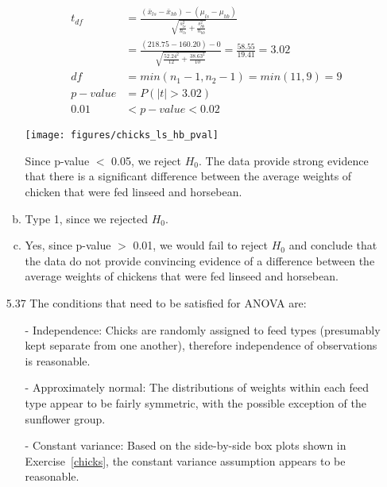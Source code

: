 \documentclass[11pt]{article}
\begin{document}
\begin{enumerate}
\begin{enumerate}[(a)]
\begin{minipage}[c]{0.5\textwidth}
\begin{align*} 
t_{df} &= \frac{(\bar{x}_{ls} - \bar{x}_{hb}) - (\mu_{ls} - \mu_{hb})}{\sqrt{ \frac{s_{ls}^2}{n_{ls}} + \frac{s_{hb}^2}{n_{hb}} }} \\
&= \frac{(218.75 - 160.20) - 0}{ \sqrt{\frac{52.24^2}{12} + \frac{38.63^2}{10}} } = \frac{58.55}{19.41} = 3.02 \\
df &= min(n_1 - 1, n_2 - 1) = min(11,9) = 9 \\
p-value &= P(|t| > 3.02) \\
0.01 &< p-value < 0.02
\end{align*}
\end{minipage}
\begin{minipage}[c]{0.5\textwidth}
\begin{center}
\texttt{[image: figures/chicks\_ls\_hb\_pval]}
\end{center}
\end{minipage}

Since p-value $<$ 0.05, we reject $H_0$. The data provide strong evidence that there is a significant difference between the average weights of chicken that were fed linseed and horsebean.

\item Type 1, since we rejected $H_0$.

\item Yes, since p-value $>$ 0.01, we would fail to reject $H_0$ and conclude that the data do not provide convincing evidence of a difference between the average weights of chickens that were fed linseed and horsebean.

\end{enumerate}

%

\item[5.37]
The conditions that need to be satisfied for ANOVA are:
\begin{itemize}
\item[-] Independence: Chicks are randomly assigned to feed types (presumably kept separate from one another), therefore independence of observations is reasonable.
\item[-] Approximately normal: The distributions of weights within each feed type appear to be fairly symmetric, with the possible exception of the sunflower group.
\item[-] Constant variance: Based on the side-by-side box plots shown in Exercise~\ref{chicks}, the constant variance assumption appears to be reasonable.
\end{itemize}


\end{enumerate}
\end{document}
